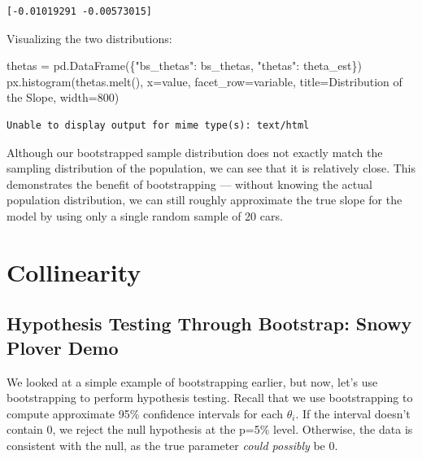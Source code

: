 \documentclass[
  letterpaper,
  DIV=11,
  numbers=noendperiod]{scrreprt}
\newenvironment{Shaded}{\begin{snugshade}}{\end{snugshade}}
\newcommand{\DecValTok}[1]{\textcolor[rgb]{0.68,0.00,0.00}{#1}}
\newcommand{\NormalTok}[1]{\textcolor[rgb]{0.00,0.23,0.31}{#1}}
\newcommand{\OperatorTok}[1]{\textcolor[rgb]{0.37,0.37,0.37}{#1}}
\newcommand{\StringTok}[1]{\textcolor[rgb]{0.13,0.47,0.30}{#1}}
\begin{document}
\begin{verbatim}
[-0.01019291 -0.00573015]
\end{verbatim}

Visualizing the two distributions:

\begin{Shaded}
\begin{Highlighting}[]
\NormalTok{thetas }\OperatorTok{=}\NormalTok{ pd.DataFrame(\{}\StringTok{"bs\_thetas"}\NormalTok{: bs\_thetas, }\StringTok{"thetas"}\NormalTok{: theta\_est\})}
\NormalTok{px.histogram(thetas.melt(), x}\OperatorTok{=}\StringTok{\textquotesingle{}value\textquotesingle{}}\NormalTok{, facet\_row}\OperatorTok{=}\StringTok{\textquotesingle{}variable\textquotesingle{}}\NormalTok{, }
\NormalTok{             title}\OperatorTok{=}\StringTok{\textquotesingle{}Distribution of the Slope\textquotesingle{}}\NormalTok{, width}\OperatorTok{=}\DecValTok{800}\NormalTok{)}
\end{Highlighting}
\end{Shaded}

\begin{verbatim}
Unable to display output for mime type(s): text/html
\end{verbatim}

Although our bootstrapped sample distribution does not exactly match the
sampling distribution of the population, we can see that it is
relatively close. This demonstrates the benefit of bootstrapping ---
without knowing the actual population distribution, we can still roughly
approximate the true slope for the model by using only a single random
sample of 20 cars.

\section{Collinearity}\label{collinearity}

\subsection{Hypothesis Testing Through Bootstrap: Snowy Plover
Demo}\label{hypothesis-testing-through-bootstrap-snowy-plover-demo}

We looked at a simple example of bootstrapping earlier, but now, let's
use bootstrapping to perform hypothesis testing. Recall that we use
bootstrapping to compute approximate 95\% confidence intervals for each
\(\theta_i\). If the interval doesn't contain 0, we reject the null
hypothesis at the p=5\% level. Otherwise, the data is consistent with
the null, as the true parameter \emph{could possibly} be 0.
\end{document}
